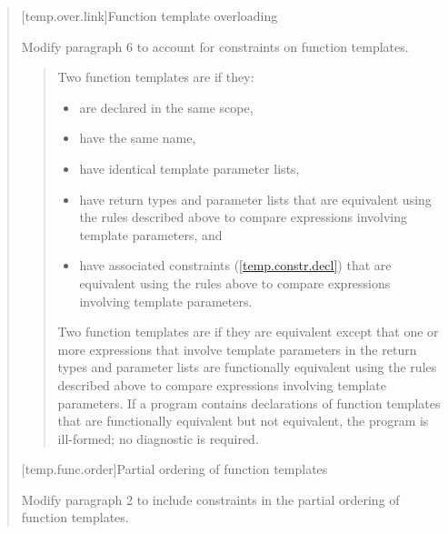 \begin{quote}
[temp.over.link]{Function template overloading}

Modify paragraph 6 to account for constraints on function templates.

\begin{quote}
\setcounter{Paras}{5}
\pnum

% 
\begin{addedblock}
Two function templates are  if they:
\begin{itemize}
\item are declared in the same scope,

\item have the same name,

\item have identical template parameter lists,

\item have return types and parameter lists that are equivalent using the 
rules described above to compare expressions involving template parameters, and

\item have associated constraints (\ref{temp.constr.decl}) that are equivalent 
using the rules above to compare expressions involving template parameters.
\end{itemize}
\end{addedblock}
% 
Two function templates are  if they 
are equivalent except that one or more expressions that involve 
template parameters in the return types and parameter lists are functionally equivalent using 
the rules described above to compare expressions involving template parameters.
% 
If a program contains declarations of function templates that are 
functionally equivalent but not equivalent, the program is ill-formed; 
no diagnostic is required.
\end{quote}


[temp.func.order]{Partial ordering of function templates}

Modify paragraph 2 to include constraints in the partial ordering
of function templates.


\end{quote}
